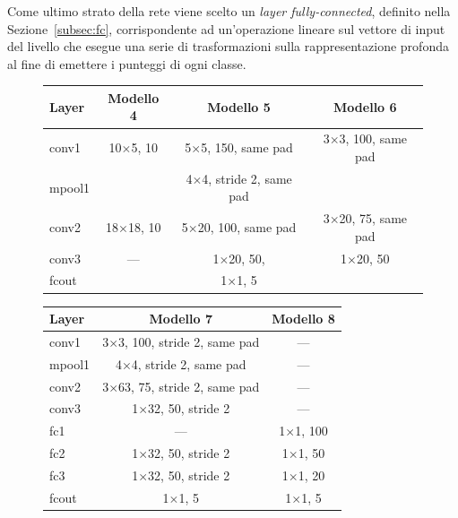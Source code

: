 Come ultimo strato della rete viene scelto un \emph{layer fully-connected}, definito nella Sezione~\ref{subsec:fc}, corrispondente ad un'operazione lineare sul vettore di input del livello che esegue una serie di trasformazioni sulla rappresentazione profonda al fine di emettere i punteggi di ogni classe.

\begin{figure}[H]
	\centering
	\begin{tabular}{lccc}
		\toprule
		\textbf{Layer}& \textbf{Modello 4} & \textbf{Modello 5} & \textbf{Modello 6} 		\\ 
		\midrule
		conv1 	& {10}$\times${5}, 10	  & {5}$\times${5}, 150, same pad    &{3}$\times${3}, 100, same pad 		   \\
		
		mpool1 	& &{{4}$\times${4}, stride 2, same pad}	&   \\
		conv2  	& {18}$\times${18}, 10	  &  {5}$\times${20}, 100, same pad	  &		{3}$\times${20}, 75, same pad    \\
		conv3  	& ---	  & {1}$\times${20}, 50, 	   &	{1}$\times${20}, 50 	   \\
		fcout		& &{{1}$\times${1}, 5}&		   \\
		
		\bottomrule	
	\end{tabular}
	\label{tab:netemb1}
\end{figure}

\begin{figure}[H]
	\centering
	\begin{tabular}{lcc}
		\toprule
		\textbf{Layer}& \textbf{Modello 7} 								  & \textbf{Modello 8} 			   \\ 
		\midrule
		conv1 	& {3}$\times${3}, 100, stride 2, same pad     & ---	   \\
		mpool1 	& {4}$\times${4}, stride 2, same pad		  & ---	   \\
		conv2  	& {3}$\times${63}, 75, stride 2, same pad	  & ---    \\
		conv3  	& {1}$\times${32}, 50, stride 2	  				  & ---	   \\
		fc1  	& ---													  & {1}$\times${1}, 100	   \\
		fc2  	& {1}$\times${32}, 50, stride 2	  				  & {1}$\times${1},  50    \\
		fc3  	& {1}$\times${32}, 50, stride 2	  				  & {1}$\times${1},  20	   \\
		fcout	& {1}$\times${1}, 5   			  				  & {1}$\times${1},   5	   \\
		\bottomrule	
	\end{tabular}
	\label{tab:netemb2}
\end{figure}

